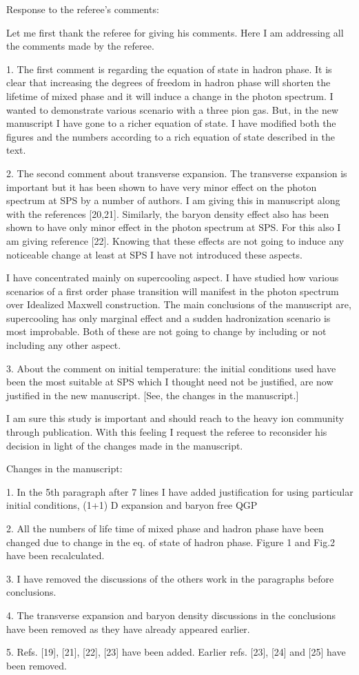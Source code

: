  Response to the referee's comments:

  Let me first thank the referee for giving his comments. Here I am 
addressing all the comments made by the referee.  

1. The first comment is regarding the equation of state in hadron 
phase. It is clear that increasing the degrees of freedom in hadron 
phase will shorten the lifetime of mixed phase and it will induce a 
change in the photon spectrum. I wanted to demonstrate various scenario 
with a three pion gas. But, in the new manuscript I have gone to a 
richer equation of state. I have modified both the figures and the 
numbers according to a rich equation of state described in the text.

2. The second comment about transverse expansion. The transverse 
expansion is important but it has been shown to have very minor effect 
on the photon spectrum at SPS by a number of authors. I am giving this 
in manuscript along with the references [20,21]. Similarly, the baryon 
density effect also has been shown to have only minor effect in the 
photon spectrum at SPS. For this also I am giving reference [22]. 
Knowing that these effects are not going to induce any noticeable 
change at least at SPS I have not introduced these aspects.
 
  I have concentrated mainly on supercooling aspect. I have studied 
how various scenarios of a first order phase transition will manifest 
in the photon spectrum over Idealized Maxwell construction. The main 
conclusions of the manuscript are, supercooling has only marginal 
effect and a sudden hadronization scenario is most improbable. Both 
of these are not going to change by including or not including any 
other aspect.

3. About the comment on initial temperature: the initial conditions 
used have been the most suitable at SPS which I thought need not be 
justified, are now justified in the new manuscript.
[See, the changes in the manuscript.]

  I am sure this study is important and should reach to the heavy ion 
community through publication. With this feeling I request the referee 
to reconsider his decision in light of the changes made in the manuscript.


 Changes in the manuscript:
 
1. In the 5th paragraph after 7 lines I have added justification for 
using particular initial conditions, (1+1) D expansion and baryon free
QGP

2. All the numbers of life time of mixed phase and hadron phase have 
been changed due to change in the eq. of state of hadron phase.
Figure 1 and Fig.2 have been recalculated.

3. I have removed the discussions of the others work in the paragraphs 
before conclusions.

4. The transverse expansion and baryon density discussions in the 
conclusions have been removed as they have already appeared earlier.

5. Refs. [19], [21], [22], [23] have been added. Earlier refs. [23],
[24] and [25] have been removed.


